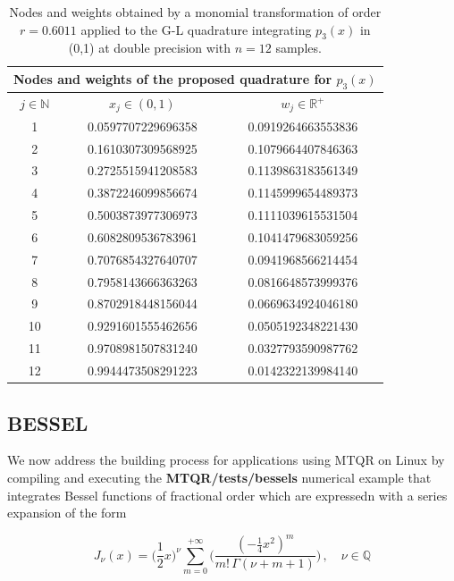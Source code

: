 \documentclass[a4paper, twosided]{book}
\begin{document}
\begin{table}[H]
\centering
\begin{tabular}{|c||c|c|}
\hline
\multicolumn{3}{|c|}{\textbf{Nodes and weights of the proposed quadrature for $p_3(x)$}} \\
\hline
$j\in\mathbb{N}$ & $x_j\in(0,1)$ & $w_j\in\mathbb{R}^+$ \\
\hline
1   &  0.0597707229696358   &  0.0919264663553836  \\
2   &  0.1610307309568925   &  0.1079664407846363  \\
3   &  0.2725515941208583   &  0.1139863183561349  \\
4   &  0.3872246099856674   &  0.1145999654489373  \\
5   &  0.5003873977306973   &  0.1111039615531504  \\
6   &  0.6082809536783961   &  0.1041479683059256  \\
7   &  0.7076854327640707   &  0.0941968566214454  \\
8   &  0.7958143666363263   &  0.0816648573999376  \\
9   &  0.8702918448156044   &  0.0669634924046180  \\
10  &  0.9291601555462656   &  0.0505192348221430  \\
11  &  0.9708981507831240   &  0.0327793590987762  \\
12  &  0.9944473508291223   &  0.0142322139984140  \\
\hline
\end{tabular}
  \caption{Nodes and weights obtained by a monomial transformation of order $r=0.6011$ applied to the G-L quadrature integrating $p_3(x)$ in (0,1) at double precision with $n=12$ samples.}
  \label{table2.4}
\end{table}

\subsection[Bessel]{\changefont BESSEL}\label{SubSec2.4.2}
We now address the building process for applications using MTQR on Linux by compiling and executing the \colorbox{poliGrayBlue}{\textbf{MTQR/tests/bessels}} numerical example that integrates Bessel functions of fractional order \cite{Abramowitz} which are expressedn with a series expansion of the form

\begin{equation*}
    J_{\nu}(x) = \bigg(\frac{1}{2}x\bigg)^{\nu}\sum_{m=0}^{+\infty}\bigg(\frac{(-\frac{1}{4}x^2)^{m}}{m!\,\Gamma(\nu+m+1)}\bigg)\,,\quad\nu\in\mathbb{Q}
\end{equation*}
\end{document}
